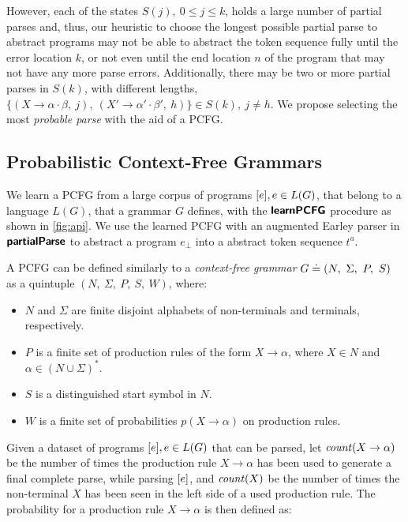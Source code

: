 %
However, each of the states $S(j),\ 0 \leq j \leq k$, holds a large number of
partial parses and, thus, our heuristic to choose the longest possible partial
parse to abstract programs may not be able to abstract the token sequence fully
until the error location $k$, or not even until the end location $n$ of the
program that may not have any more parse errors. Additionally, there may be two
or more partial parses in $S(k)$, with different lengths, \eg $\{(X \rightarrow
\alpha \cdot \beta,\ j),\ (X' \rightarrow \alpha' \cdot \beta',\ h)\} \in S(k),\
j \neq h$. We propose selecting the most \emph{probable parse} with the aid of a
PCFG.


\subsection{Probabilistic Context-Free Grammars}
\label{sec:prog-abstract:pcfg}

We learn a PCFG from a large corpus of programs $[e], e \in L(G)$, that
belong to a language $L(G)$, that a grammar $G$ defines, with the
$\bm{\mathsf{learnPCFG}}$ procedure as shown in \autoref{fig:api}.
%
We use the learned PCFG with an augmented Earley parser in
$\bm{\mathsf{partialParse}}$ to abstract a program $e_{\bot}$ into a abstract
token sequence $t^a$.

%
A PCFG can be defined similarly to a \emph{context-free grammar} $G \doteq (N,\
\Sigma,\ P,\ S)$ as a quintuple $(N,\ \Sigma,\ P,\ S,\ W)$, where:
\begin{itemize}
    \item $N$ and $\Sigma$ are finite disjoint alphabets of non-terminals and
    terminals, respectively.
    \item $P$ is a finite set of production rules of the form $X \rightarrow
    \alpha$, where $X \in N$ and $\alpha \in (N \cup \Sigma)^{\ast}$.
    \item $S$ is a distinguished start symbol in $N$.
    \item $W$ is a finite set of probabilities $p(X \rightarrow \alpha)$ on
    production rules.
\end{itemize}


Given a dataset of programs $[e], e \in L(G)$ that can be parsed, let
$\mathit{count}(X \rightarrow \alpha)$ be the number of times the production rule $X
\rightarrow \alpha$ has been used to generate a final complete parse, while
parsing $[e]$, and $\mathit{count}(X)$ be the number of times the non-terminal $X$
has been seen in the left side of a used production rule. The probability for a
production rule $X \rightarrow \alpha$ is then defined as:

